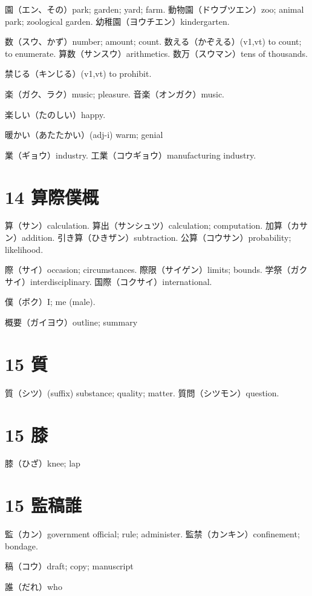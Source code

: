 園（エン、その）park; garden; yard; farm.
動物園（ドウブツエン）zoo; animal park; zoological garden.
幼稚園（ヨウチエン）kindergarten.

数（スウ、かず）number; amount; count.
数える（かぞえる）(v1,vt) to count; to enumerate.
算数（サンスウ）arithmetics.
数万（スウマン）tens of thousands.

禁じる（キンじる）(v1,vt) to prohibit.

楽（ガク、ラク）music; pleasure.
音楽（オンガク）music.

楽しい（たのしい）happy.

暖かい（あたたかい）(adj-i) warm; genial

業（ギョウ）industry.
工業（コウギョウ）manufacturing industry.

\section{14 算際僕概}

算（サン）calculation.
算出（サンシュツ）calculation; computation.
加算（カサン）addition.
引き算（ひきザン）subtraction.
公算（コウサン）probability; likelihood.

際（サイ）occasion; circumstances.
際限（サイゲン）limits; bounds.
学祭（ガクサイ）interdisciplinary.
国際（コクサイ）international.

僕（ボク）I; me (male).

概要（ガイヨウ）outline; summary

\section{15 質}

質（シツ）(suffix) substance; quality; matter.
質問（シツモン）question.

\section{15 膝}

膝（ひざ）knee; lap

\section{15 監稿誰}

監（カン）government official; rule; administer.
監禁（カンキン）confinement; bondage.

稿（コウ）draft; copy; manuscript

誰（だれ）who


